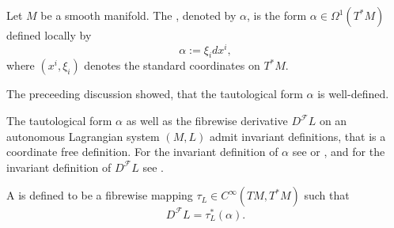 \begin{definition}
	\label{def:tautological_form}
	Let $M$ be a smooth manifold. The , denoted by $\alpha$, is the form  $\alpha \in \Omega^1(T^*M)$ defined locally by
	\begin{equation*}
		\alpha := \xi_idx^i,
	\end{equation*}
	\noindent where $(x^i,\xi_i)$ denotes the standard coordinates on $T^*M$.
\end{definition}

\begin{remark}
	The preceeding discussion showed, that the tautological form $\alpha$ is well-defined.
\end{remark}

\begin{remark}
	The tautological form $\alpha$ as well as the fibrewise derivative $D^\mathcal{F}L$ on an autonomous Lagrangian system $(M,L)$ admit invariant definitions, that is a coordinate free definition. For the invariant definition of $\alpha$ see \cite[569]{lee:smooth_manifolds:2013} or \cite[10--11]{silva:SG:2008}, and for the invariant definition of $D^\mathcal{F}L$ see \cite[31]{takhtajan:QM:2008}. 
\end{remark}

\begin{definition}
	\label{def:Legendre_transform}
	A  is defined to be a fibrewise mapping $\tau_L \in C^\infty(TM,T^*M)$ such that
	\begin{equation*}
		D^\mathcal{F}L = \tau_L^*(\alpha).
	\end{equation*}
\end{definition}

